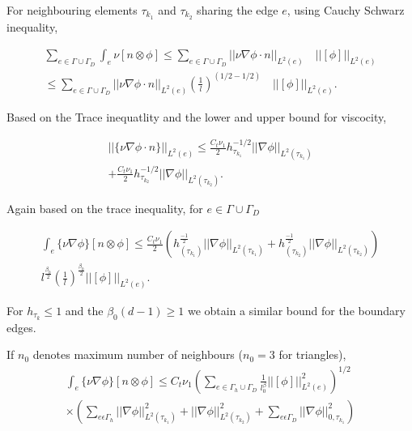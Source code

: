 \documentclass[a4paper,twoside,openright]{book}
\begin{document}
For neighbouring elements $\tau_{k_1}$ and $\tau_{k_2}$ sharing the edge $e$,  using Cauchy Schwarz inequality, 

\begin{equation}
\begin{split}
\sum_{e \in \Gamma \cup \Gamma_D} \int_e {\nu}[n \otimes \phi] \leq \sum_{e \in \Gamma \cup \Gamma_D} ||\nu \nabla \phi \cdot n||_{L^2(e)} \quad ||[\phi]||_{L^2(e)} \\ \leq \sum_{e \in \Gamma \cup \Gamma_D} ||\nu \nabla \phi \cdot n||_{L^2(e)} (\frac{1}{l})^{(1/2-1/2)} \quad ||[\phi]||_{L^2(e)} \textrm{.}
\end{split}
\end{equation}

Based on the Trace inequatlity and the lower and upper bound for viscocity, 

\begin{equation}
\begin{split}
||\lbrace \nu \nabla \phi \cdot n \rbrace||_{L^2(e)} \leq \frac{C_t \nu_1}{2} {h_{\tau_{k_1}}^{-1/2}} ||\nabla \phi||_{L^2({\tau_{k_1}})} \\ + \frac{C_t \nu_1}{2} {h_{{\tau_{k_2}}}^{-1/2}} ||\nabla \phi||_{L^2({\tau_{k_2}})} \textrm{.}
\end{split}
\end{equation}

Again based on the trace inequality, for $e \in \Gamma \cup \Gamma_D$

\begin{equation}
\begin{split}
\int_e \lbrace \nu \nabla \phi \rbrace [n \otimes \phi] \leq \frac{C_t \nu_1}{2}  \left( h_{(\tau_{k_1})}^{\frac{-1}{2}} ||\nabla \phi||_{L^2{(\tau_{k_1})}} + {h_{(\tau_{k_2})}^{\frac{-1}{2}}} ||\nabla \phi||_{L^2{(\tau_{k_2})}} \right) \\ l^{\frac{\beta_0}{2}} \left({\frac{1}{l}}\right)^{\frac{\beta_0}{2}} ||[\phi]||_{L^2(e)} \textrm{.}
\end{split}
\end{equation}

For $h_{\tau_k} \leq 1$ and the $\beta_0 (d-1) \geq 1$ we obtain a similar bound for the boundary edges.

If $n_0$ denotes maximum number of neighbours ($n_0 = 3$ for triangles),
\begin{equation}
\begin{split}
\int_e \lbrace \nu \nabla \phi \rbrace[n \otimes \phi] \leq C_t \nu_1 \left( \sum_{e \in \Gamma_h \cup \Gamma_D} \frac{1}{l^\beta_0} ||[\phi]||^2_{L^2(e)} \right)^{1/2} \\ \times \left( \sum_{e \epsilon \Gamma_h} ||\nabla \phi||^2_{L^2(\tau_{k_1})} + ||\nabla \phi||^2_{L^2(\tau_{k_2})} + \sum_{e \epsilon \Gamma_D} ||\nabla \phi||^2_{0,\tau_{k_1}} \right)
\end{split}
\end{equation}
\end{document}
